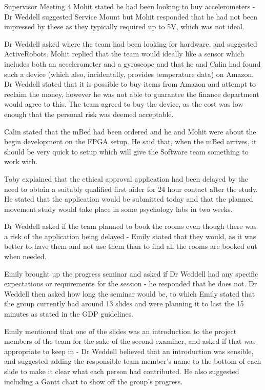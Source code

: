 \documentclass{article}
\begin{document}
\begin{Minutes}{Supervisor Meeting 4}
Mohit stated he had been looking to buy accelerometers - Dr Weddell suggested Service Mount but Mohit responded that he had not been impressed by these as they typically required up to 5V, which was not ideal.

Dr Weddell asked where the team had been looking for hardware, and suggested ActiveRobots. Mohit replied that the team would ideally like a sensor which includes both an accelerometer and a gyroscope and that he and Calin had found such a device (which also, incidentally, provides temperature data) on Amazon. Dr Weddell stated that it is possible to buy items from Amazon and attempt to reclaim the money, however he was not able to guarantee the finance department would agree to this.
The team agreed to buy the device, as the cost was low enough that the personal risk was deemed acceptable.


Calin stated that the mBed had been ordered and he and Mohit were about the begin development on the FPGA setup.
He said that, when the mBed arrives, it should be very quick to setup which will give the Software team something to work with.

Toby explained that the ethical approval application had been delayed by the need to obtain a suitably qualified first aider for 24 hour contact after the study.
He stated that the application would be submitted today and that the planned movement study would take place in some psychology labs in two weeks.

Dr Weddell asked if the team planned to book the rooms even though there was a risk of the application being delayed -
Emily stated that they would, as it was better to have them and not use them than to find all the rooms are booked out when needed.

Emily brought up the progress seminar and asked if Dr Weddell had any specific expectations or requirements for the session - he responded that he does not.
Dr Weddell then asked how long the seminar would be, to which Emily stated that the group currently had around 13 slides and were planning it to last the 15 minutes as stated in the GDP guidelines.

Emily mentioned that one of the slides was an introduction to the project members of the team for the sake of the second examiner, and asked if that was appropriate to keep in -
Dr Weddell believed that an introduction was sensible, and suggested adding the responsible team member's name to the bottom of each slide to make it clear what each person had contributed. He also suggested including a Gantt chart to show off the group's progress.


\end{Minutes}
\end{document}
